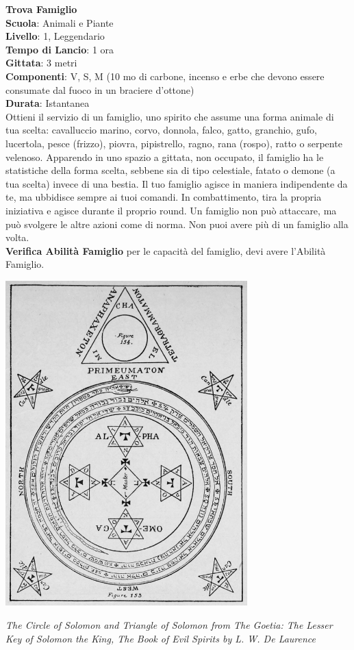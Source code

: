 \begin{multicols}{2}
\medskip\textbf{Trova Famiglio}\\
\textbf{Scuola}: Animali e Piante\\
\textbf{Livello}: 1, Leggendario\\
\textbf{Tempo di Lancio}: 1 ora\\
\textbf{Gittata}: 3 metri\\
\textbf{Componenti}: V, S, M (10 mo di carbone, incenso e erbe che devono essere consumate dal fuoco in un braciere d'ottone)\\
\textbf{Durata}: Istantanea\\
Ottieni il servizio di un famiglio, uno spirito che assume una forma animale di tua scelta: cavalluccio marino, corvo, donnola, falco, gatto, granchio, gufo, lucertola, pesce (frizzo), piovra, pipistrello, ragno, rana (rospo), ratto o serpente velenoso. Apparendo in uno spazio a gittata, non occupato, il famiglio ha le statistiche della forma scelta, sebbene sia di tipo celestiale, fatato o demone (a tua scelta) invece di una bestia. Il tuo famiglio agisce in maniera indipendente da te, ma ubbidisce sempre ai tuoi comandi. In combattimento, tira la propria iniziativa e agisce durante il proprio round. Un famiglio non può attaccare, ma può svolgere le altre azioni come di norma.
Non puoi avere più di un famiglio alla volta. \\
\textbf{Verifica Abilità Famiglio} per le capacità del famiglio, devi avere l'Abilità Famiglio.


\end{multicols}

\vfill

\begin{center}
\includegraphics[keepaspectratio,width=0.70\textwidth]{immagini/Goetic_circle_from_The_Lesser_Key_of_Solomon.png}

\textit{The Circle of Solomon and Triangle of Solomon from The Goetia: The Lesser Key of Solomon the King, The Book of Evil Spirits by L. W. De Laurence}
\end{center}

